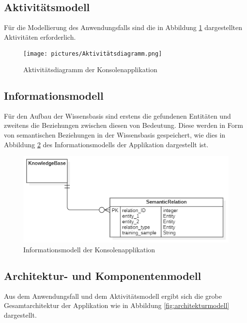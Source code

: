 \subsection{Aktivitätsmodell}

Für die Modellierung des Anwendungsfalls sind die in Abbildung \ref{fig:Aktivitätsmodell} dargestellten Aktivitäten erforderlich.

\begin{figure}[]
    \centering
    \texttt{[image: pictures/Aktivitätsdiagramm.png]}
    \caption{Aktivitätsdiagramm der Konsolenapplikation}
    \label{fig:Aktivitätsmodell}
\end{figure}

\subsection{Informationsmodell}

Für den Aufbau der Wissensbasis sind erstens die gefundenen Entitäten und zweitens die Beziehungen zwischen diesen von Bedeutung. Diese werden in Form von semantischen Beziehungen in der Wissensbasis gespeichert, wie dies in  Abbildung \ref{fig:informationsmodell} des Informationsmodells der Applikation dargestellt ist.

\begin{figure}[h]
    \centering
    \includegraphics[width=\textwidth]{pictures/Informationsmodell.png}
    \caption{Informationsmodell der Konsolenapplikation}
    \label{fig:informationsmodell}
\end{figure}

\subsection{Architektur- und Komponentenmodell}

Aus dem Anwendungsfall und dem Aktivitätsmodell ergibt sich die grobe Gesamtarchitektur der Applikation wie in Abbildung \ref{fig:architekturmodell} dargestellt.


